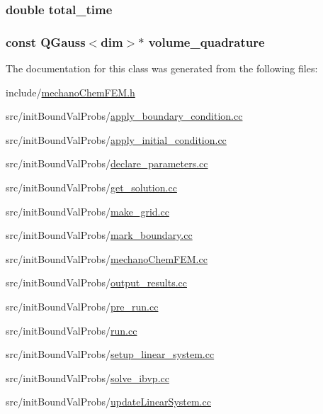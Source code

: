 \subsubsection[{total\-\_\-time}]{\setlength{\rightskip}{0pt plus 5cm}double total\-\_\-time}\label{classmechano_chem_f_e_m_abc276e47b85df9dd59f248e663b3b971}
\subsubsection[{volume\-\_\-quadrature}]{\setlength{\rightskip}{0pt plus 5cm}const Q\-Gauss$<$dim$>$$\ast$ volume\-\_\-quadrature}\label{classmechano_chem_f_e_m_a7e2363a91f6f1626f463f3a06108c03b}


The documentation for this class was generated from the following files\-:\begin{DoxyCompactItemize}
\item 
include/\hyperlink{mechano_chem_f_e_m_8h}{mechano\-Chem\-F\-E\-M.\-h}\item 
src/init\-Bound\-Val\-Probs/\hyperlink{apply__boundary__condition_8cc}{apply\-\_\-boundary\-\_\-condition.\-cc}\item 
src/init\-Bound\-Val\-Probs/\hyperlink{apply__initial__condition_8cc}{apply\-\_\-initial\-\_\-condition.\-cc}\item 
src/init\-Bound\-Val\-Probs/\hyperlink{init_bound_val_probs_2declare__parameters_8cc}{declare\-\_\-parameters.\-cc}\item 
src/init\-Bound\-Val\-Probs/\hyperlink{get__solution_8cc}{get\-\_\-solution.\-cc}\item 
src/init\-Bound\-Val\-Probs/\hyperlink{make__grid_8cc}{make\-\_\-grid.\-cc}\item 
src/init\-Bound\-Val\-Probs/\hyperlink{mark__boundary_8cc}{mark\-\_\-boundary.\-cc}\item 
src/init\-Bound\-Val\-Probs/\hyperlink{mechano_chem_f_e_m_8cc}{mechano\-Chem\-F\-E\-M.\-cc}\item 
src/init\-Bound\-Val\-Probs/\hyperlink{output__results_8cc}{output\-\_\-results.\-cc}\item 
src/init\-Bound\-Val\-Probs/\hyperlink{pre__run_8cc}{pre\-\_\-run.\-cc}\item 
src/init\-Bound\-Val\-Probs/\hyperlink{run_8cc}{run.\-cc}\item 
src/init\-Bound\-Val\-Probs/\hyperlink{setup__linear__system_8cc}{setup\-\_\-linear\-\_\-system.\-cc}\item 
src/init\-Bound\-Val\-Probs/\hyperlink{solve__ibvp_8cc}{solve\-\_\-ibvp.\-cc}\item 
src/init\-Bound\-Val\-Probs/\hyperlink{update_linear_system_8cc}{update\-Linear\-System.\-cc}\end{DoxyCompactItemize}

